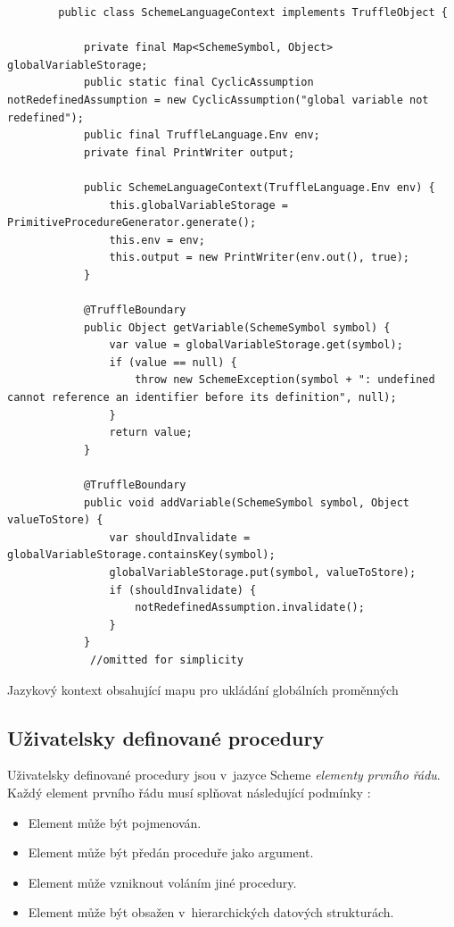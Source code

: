 \documentclass[
  master,
  biblatex,
  figures=true,
  theorems,
  sourcecodes,
  glossaries,
  index
]{kidiplom}
\begin{document}
\begin{listing} 
    \begin{verbatim}
        public class SchemeLanguageContext implements TruffleObject {
        
            private final Map<SchemeSymbol, Object> globalVariableStorage;
            public static final CyclicAssumption notRedefinedAssumption = new CyclicAssumption("global variable not redefined");
            public final TruffleLanguage.Env env;
            private final PrintWriter output;
        
            public SchemeLanguageContext(TruffleLanguage.Env env) {
                this.globalVariableStorage = PrimitiveProcedureGenerator.generate();
                this.env = env;
                this.output = new PrintWriter(env.out(), true);
            }
        
            @TruffleBoundary
            public Object getVariable(SchemeSymbol symbol) {
                var value = globalVariableStorage.get(symbol);
                if (value == null) {
                    throw new SchemeException(symbol + ": undefined cannot reference an identifier before its definition", null);
                }
                return value;
            }
        
            @TruffleBoundary
            public void addVariable(SchemeSymbol symbol, Object valueToStore) {
                var shouldInvalidate = globalVariableStorage.containsKey(symbol);
                globalVariableStorage.put(symbol, valueToStore);
                if (shouldInvalidate) {
                    notRedefinedAssumption.invalidate();
                }
            }
             //omitted for simplicity
    \end{verbatim}
    \caption{Jazykový kontext obsahující mapu pro ukládání globálních proměnných}
    \label{SchemeLanguageContext}
\end{listing}


\clearpage


\subsection{Uživatelsky definované procedury}
\label{chapter-user-defined-procedures}
Uživatelsky definované procedury jsou v~jazyce Scheme \textit{elementy prvního řádu}. Každý element prvního řádu musí splňovat následující podmínky \cite{paradigmata-programovani1a}: 

\begin{itemize}
    \item Element může být pojmenován.
    \item Element může být předán proceduře jako argument.
    \item Element může vzniknout voláním jiné procedury.
    \item Element může být obsažen v~hierarchických datových strukturách. 
\end{itemize}
\end{document}

